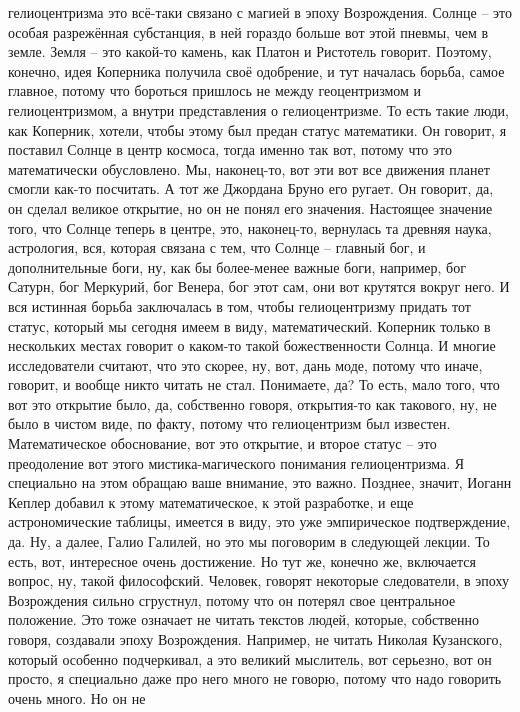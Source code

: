 гелиоцентризма это всё-таки связано с магией в эпоху Возрождения. Солнце – это
особая разрежённая субстанция, в ней гораздо больше вот этой пневмы, чем в
земле. Земля – это какой-то камень, как Платон и Ристотель говорит. Поэтому,
конечно, идея Коперника получила своё одобрение, и тут началась борьба, самое
главное, потому что бороться пришлось не между геоцентризмом и гелиоцентризмом,
а внутри представления о гелиоцентризме. То есть такие люди, как Коперник,
хотели, чтобы этому был предан статус математики. Он говорит, я поставил Солнце
в центр космоса, тогда именно так вот, потому что это математически обусловлено.
Мы, наконец-то, вот эти вот все движения планет смогли как-то посчитать. А тот
же Джордана Бруно его ругает. Он говорит, да, он сделал великое открытие, но он
не понял его значения. Настоящее значение того, что Солнце теперь в центре, это,
наконец-то, вернулась та древняя наука, астрология, вся, которая связана с тем,
что Солнце – главный бог, и дополнительные боги, ну, как бы более-менее важные
боги, например, бог Сатурн, бог Меркурий, бог Венера, бог этот сам, они вот
крутятся вокруг него. И вся истинная борьба заключалась в том, чтобы
гелиоцентризму придать тот статус, который мы сегодня имеем в виду,
математический. Коперник только в нескольких местах говорит о каком-то такой
божественности Солнца. И многие исследователи считают, что это скорее, ну, вот,
дань моде, потому что иначе, говорит, и вообще никто читать не стал. Понимаете,
да? То есть, мало того, что вот это открытие было, да, собственно говоря,
открытия-то как такового, ну, не было в чистом виде, по факту, потому что
гелиоцентризм был известен. Математическое обоснование, вот это открытие, и
второе статус – это преодоление вот этого мистика-магического понимания
гелиоцентризма. Я специально на этом обращаю ваше внимание, это важно. Позднее,
значит, Иоганн Кеплер добавил к этому математическое, к этой разработке, и еще
астрономические таблицы, имеется в виду, это уже эмпирическое подтверждение, да.
Ну, а далее, Галио Галилей, но это мы поговорим в следующей лекции. То есть,
вот, интересное очень достижение. Но тут же, конечно же, включается вопрос, ну,
такой философский. Человек, говорят некоторые следователи, в эпоху Возрождения
сильно сгрустнул, потому что он потерял свое центральное положение. Это тоже
означает не читать текстов людей, которые, собственно говоря, создавали эпоху
Возрождения. Например, не читать Николая Кузанского, который особенно
подчеркивал, а это великий мыслитель, вот серьезно, вот он просто, я специально
даже про него много не говорю, потому что надо говорить очень много. Но он не
